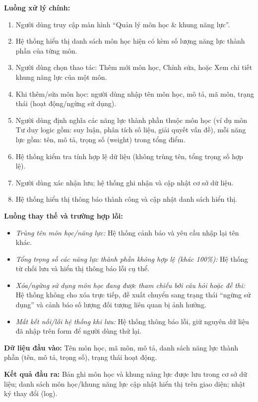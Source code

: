\documentclass[12pt,a4paper]{article}
\newcommand{\ucfield}[2]{\noindent\textbf{#1: } #2\par\vspace{0.35em}}
\begin{document}
	\ucfield{Luồng xử lý chính}{
		\begin{enumerate}[nosep]
			\item Người dùng truy cập màn hình ``Quản lý môn học \& khung năng lực''.
			\item Hệ thống hiển thị danh sách môn học hiện có kèm số lượng năng lực thành phần của từng môn.
			\item Người dùng chọn thao tác: Thêm mới môn học, Chỉnh sửa, hoặc Xem chi tiết khung năng lực của một môn.
			\item Khi thêm/sửa môn học: người dùng nhập tên môn học, mô tả, mã môn, trạng thái (hoạt động/ngừng sử dụng).
			\item Người dùng định nghĩa các năng lực thành phần thuộc môn học (ví dụ môn Tư duy logic gồm: suy luận, phân tích số liệu, giải quyết vấn đề), mỗi năng lực gồm: tên, mô tả, trọng số (weight) trong tổng điểm.
			\item Hệ thống kiểm tra tính hợp lệ dữ liệu (không trùng tên, tổng trọng số hợp lệ).
			\item Người dùng xác nhận lưu; hệ thống ghi nhận và cập nhật cơ sở dữ liệu.
			\item Hệ thống hiển thị thông báo thành công và cập nhật danh sách hiển thị.
	\end{enumerate}}
	
	\ucfield{Luồng thay thế và trường hợp lỗi}{
		\begin{itemize}[nosep]
			\item \textit{Trùng tên môn học/năng lực:} Hệ thống cảnh báo và yêu cầu nhập lại tên khác.
			\item \textit{Tổng trọng số các năng lực thành phần không hợp lệ (khác 100\%):} Hệ thống từ chối lưu và hiển thị thông báo lỗi cụ thể.
			\item \textit{Xóa/ngừng sử dụng môn học đang được tham chiếu bởi câu hỏi hoặc đề thi:} Hệ thống không cho xóa trực tiếp, đề xuất chuyển sang trạng thái ``ngừng sử dụng'' và cảnh báo số lượng đối tượng liên quan bị ảnh hưởng.
			\item \textit{Mất kết nối/lỗi hệ thống khi lưu:} Hệ thống thông báo lỗi, giữ nguyên dữ liệu đã nhập trên form để người dùng thử lại.
	\end{itemize}}
	
	\ucfield{Dữ liệu đầu vào}{Tên môn học, mã môn, mô tả, danh sách năng lực thành phần (tên, mô tả, trọng số), trạng thái hoạt động.}
	
	\ucfield{Kết quả đầu ra}{Bản ghi môn học và khung năng lực được lưu trong cơ sở dữ liệu; danh sách môn học/khung năng lực cập nhật hiển thị trên giao diện; nhật ký thay đổi (log).}
	
\end{document}
